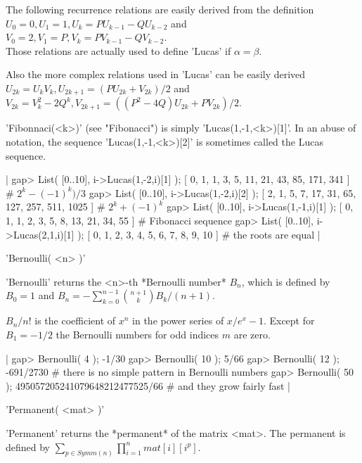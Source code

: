 The following recurrence relations are easily derived from the definition\\
$U_0 = 0, U_1 = 1, U_k = P U_{k-1} - Q U_{k-2}$ and \\
$V_0 = 2, V_1 = P, V_k = P V_{k-1} - Q V_{k-2}$. \\
Those relations are actually used to define 'Lucas' if $\alpha = \beta$.

Also the more complex relations used in 'Lucas' can be easily derived\\
$U_{2k} = U_k V_k,        U_{2k+1} = (P U_{2k} + V_{2k}) / 2$ and \\
$V_{2k} = V_k^2 - 2 Q^k,  V_{2k+1} = ((P^2-4Q) U_{2k} + P V_{2k}) / 2$.

'Fibonnaci(<k>)' (see "Fibonacci") is simply 'Lucas(1,-1,<k>)[1]'.  In an
abuse of notation, the sequence  'Lucas(1,-1,<k>)[2]' is sometimes called
the Lucas sequence.

|    gap> List( [0..10], i->Lucas(1,-2,i)[1] );
    [ 0, 1, 1, 3, 5, 11, 21, 43, 85, 171, 341 ]    # $2^k - (-1)^k)/3$
    gap> List( [0..10], i->Lucas(1,-2,i)[2] );
    [ 2, 1, 5, 7, 17, 31, 65, 127, 257, 511, 1025 ]    # $2^k + (-1)^k$
    gap> List( [0..10], i->Lucas(1,-1,i)[1] );
    [ 0, 1, 1, 2, 3, 5, 8, 13, 21, 34, 55 ]    # Fibonacci sequence
    gap> List( [0..10], i->Lucas(2,1,i)[1] );
    [ 0, 1, 2, 3, 4, 5, 6, 7, 8, 9, 10 ]    # the roots are equal |

%

'Bernoulli( <n> )'

'Bernoulli' returns the <n>-th *Bernoulli number* $B_n$, which is defined
by $B_0 = 1$ and $B_n = -\sum_{k=0}^{n-1}{{n+1 \choose k} B_k}/(n+1)$.

$B_n/n!$ is the coefficient of $x^n$  in the power series of $x/{e^x-1}$.
Except for $B_1=-1/2$ the Bernoulli numbers for odd indices $m$ are zero.

|    gap> Bernoulli( 4 );
    -1/30
    gap> Bernoulli( 10 );
    5/66
    gap> Bernoulli( 12 );
    -691/2730    # there is no simple pattern in Bernoulli numbers
    gap> Bernoulli( 50 );
    495057205241079648212477525/66    # and they grow fairly fast |


'Permanent( <mat> )'

'Permanent' returns the *permanent* of the matrix  <mat>.  The  permanent
is defined by $\sum_{p \in Symm(n)}{\prod_{i=1}^{n}{mat[i][i^p]}}$.

